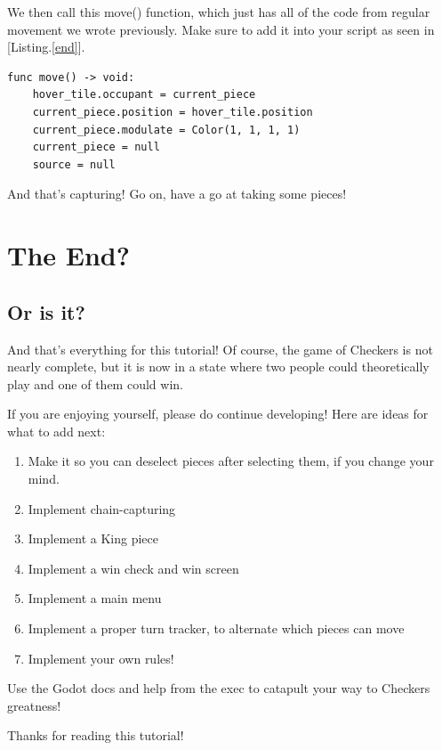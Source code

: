 \documentclass[14pt]{extarticle}
\newcommand{\prettyref}[2]{[{#1}.\ref{#2}]}
\begin{document}
We then call this move() function, which just has all of the code from regular movement we wrote previously. Make sure to add it into your script as seen in \prettyref{Listing}{end}.

\begin{lstlisting}[language=gdscript, label={end}, caption=New movement function]
func move() -> void:
	hover_tile.occupant = current_piece
	current_piece.position = hover_tile.position
	current_piece.modulate = Color(1, 1, 1, 1)
	current_piece = null
	source = null
\end{lstlisting}

And that's capturing! Go on, have a go at taking some pieces!

\section{The End?}
\subsection*{Or is it?}
And that's everything for this tutorial! Of course, the game of Checkers is not nearly complete, but it is now in a state where two people could theoretically play and one of them could win.

If you are enjoying yourself, please do continue developing! Here are ideas for what to add next:
\begin{enumerate}
    \item Make it so you can deselect pieces after selecting them, if you change your mind.
    \item Implement chain-capturing
    \item Implement a King piece
    \item Implement a win check and win screen
    \item Implement a main menu
    \item Implement a proper turn tracker, to alternate which pieces can move
    \item Implement your own rules!
\end{enumerate}
Use the Godot docs and help from the exec to catapult your way to Checkers greatness!

Thanks for reading this tutorial!



\newpage


\end{document}
